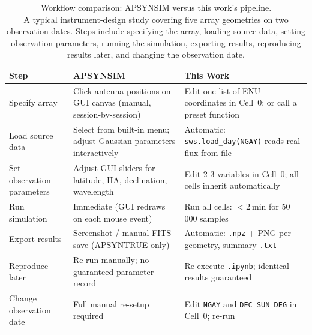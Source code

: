 \begin{table}[H]
  \centering
  \caption[Workflow comparison: \textsc{APSYNSIM} versus this work's pipeline]{Workflow comparison: \textsc{APSYNSIM} versus this work's pipeline.\\[4pt]
  A typical instrument-design study covering five array geometries on two
  observation dates. Steps include specifying the array, loading source data,
  setting observation parameters, running the simulation, exporting results,
  reproducing results later, and changing the observation date.}
  \label{tab:workflow-compare}
  \renewcommand{\arraystretch}{1.3}
  \begin{tabularx}{\textwidth}{l X X}
    \toprule
    \textbf{Step} & \textbf{\textsc{APSYNSIM}} & \textbf{This Work} \\
    \midrule
    Specify array
      & Click antenna positions on GUI canvas (manual, session-by-session)
      & Edit one list of ENU coordinates in Cell~0; or call a preset function \\
    Load source data
      & Select from built-in menu; adjust Gaussian parameters interactively
      & Automatic: \texttt{sws.load\_day(NGAY)} reads real flux from file \\
    Set observation parameters
      & Adjust GUI sliders for latitude, HA, declination, wavelength
      & Edit 2-3 variables in Cell~0; all cells inherit automatically \\
    Run simulation
      & Immediate (GUI redraws on each mouse event)
      & Run all cells: $<\SI{2}{\minute}$ for 50\,000 samples \\
    Export results
      & Screenshot / manual FITS save (APSYNTRUE only)
      & Automatic: \texttt{.npz} + PNG per geometry, summary \texttt{.txt} \\
    Reproduce later
      & Re-run manually; no guaranteed parameter record
      & Re-execute \texttt{.ipynb}; identical results guaranteed \\
    Change observation date
      & Full manual re-setup required
      & Edit \texttt{NGAY} and \texttt{DEC\_SUN\_DEG} in Cell~0; re-run \\
    \bottomrule
  \end{tabularx}
\end{table}

